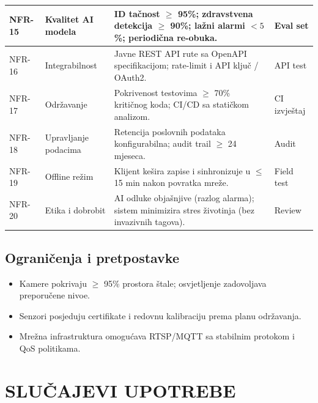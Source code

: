 \documentclass{article}
\begin{document}
\begin{longtable}{|L{1.8cm}|L{3.5cm}|L{8.8cm}|L{2.6cm}|}
\hline
NFR-15 & Kvalitet AI modela & ID tačnost $\geq$ 95\%; zdravstvena detekcija $\geq$ 90\%; lažni alarmi $<5$\%; periodična re-obuka. & Eval set \\
\hline
NFR-16 & Integrabilnost & Javne REST API rute sa OpenAPI specifikacijom; rate-limit i API ključ / OAuth2. & API test \\
\hline
NFR-17 & Održavanje & Pokrivenost testovima $\geq$ 70\% kritičnog koda; CI/CD sa statičkom analizom. & CI izvještaj \\
\hline
NFR-18 & Upravljanje podacima & Retencija poslovnih podataka konfigurabilna; audit trail $\geq$ 24 mjeseca. & Audit \\
\hline
NFR-19 & Offline režim & Klijent kešira zapise i sinhronizuje u $\leq$ 15 min nakon povratka mreže. & Field test \\
\hline
NFR-20 & Etika i dobrobit & AI odluke objašnjive (razlog alarma); sistem minimizira stres životinja (bez invazivnih tagova). & Review \\
\hline
\end{longtable}

\subsection{Ograničenja i pretpostavke}
\begin{itemize}
    \item Kamere pokrivaju $\geq$ 95\% prostora štale; osvjetljenje zadovoljava preporučene nivoe.
    \item Senzori posjeduju certifikate i redovnu kalibraciju prema planu održavanja.
    \item Mrežna infrastruktura omogućava RTSP/MQTT sa stabilnim protokom i QoS politikama.
\end{itemize}

\newpage
\section{SLUČAJEVI UPOTREBE}
\end{document}
